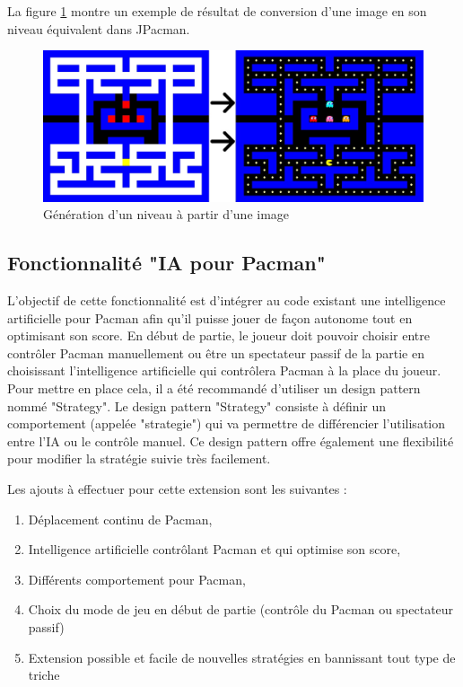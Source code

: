 \documentclass[12pt, openany]{report}
\begin{document}
La figure \ref{map_generator_img} montre un exemple de résultat de conversion d'une image en son niveau équivalent dans JPacman.
\begin{figure}[h]
	\centering
	\includegraphics[width=13cm]{Images/mapgenerator.jpg}
	\caption{\label{map_generator_img} Génération d'un niveau à partir d'une image}
\end{figure}

\subsection{Fonctionnalité "IA pour Pacman"}\label{IA}

L'objectif de cette fonctionnalité est d'intégrer au code existant une intelligence artificielle pour Pacman afin qu'il puisse jouer de façon autonome tout en optimisant son score. En début de partie, le joueur doit pouvoir choisir entre contrôler Pacman manuellement ou être un spectateur passif de la partie en choisissant l'intelligence artificielle qui contrôlera Pacman à la place du joueur. Pour mettre en place cela, il a été recommandé d'utiliser un design pattern nommé "Strategy". Le design pattern "Strategy" consiste à définir un comportement (appelée "strategie") qui va permettre de différencier l'utilisation entre l'IA ou le contrôle manuel. Ce design pattern offre également une flexibilité pour modifier la stratégie suivie très facilement.

Les ajouts à effectuer pour cette extension sont les suivantes :
\begin{enumerate}
	\item Déplacement continu de Pacman,
	\item Intelligence artificielle contrôlant Pacman et qui optimise son score,
	\item Différents comportement pour Pacman,
	\item Choix du mode de jeu en début de partie (contrôle du Pacman ou spectateur passif)
	\item Extension possible et facile de nouvelles stratégies en bannissant tout type de triche \\
	
\end{enumerate} 
\end{document}
